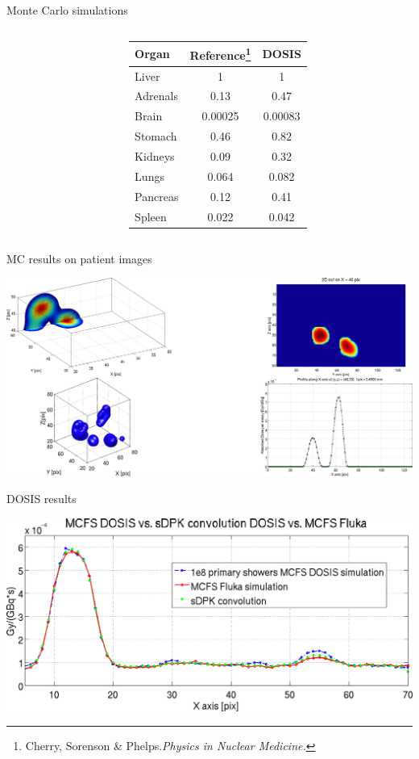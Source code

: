 \documentclass[ignorenonframetext,]{beamer}
\begin{document}
\begin{frame}{Monte Carlo simulations}
\begin{columns}
\begin{column}{.3\textwidth}
\begin{center}
\end{center}
\end{column}
\begin{column}{.7\textwidth}
\begin{center}
\begin{tabular}{l c c}
\hline
Organ & Reference\footnote{Cherry, Sorenson \& Phelps.{\it Physics in Nuclear Medicine.}} & DOSIS \\
\hline
Liver & 1 & 1 \\
Adrenals & 0.13 & 0.47 \\
Brain & 0.00025 & 0.00083 \\
Stomach & 0.46 & 0.82 \\
Kidneys & 0.09 & 0.32 \\
Lungs & 0.064 & 0.082 \\
Pancreas & 0.12 & 0.41 \\
Spleen & 0.022 & 0.042
\end{tabular}
\end{center}
\end{column}
\end{columns}

\end{frame}

\begin{frame}{MC results on patient images}
\protect\hypertarget{mc-results-on-patient-images}{}

\includegraphics{imgs/mc_results.png}

\end{frame}

\begin{frame}{DOSIS results}
\protect\hypertarget{dosis-results}{}

\includegraphics{imgs/dosis_results.png}

\end{frame}
\end{document}
